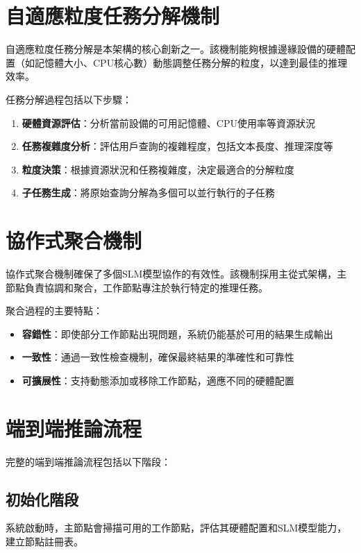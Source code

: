 \section{自適應粒度任務分解機制}

自適應粒度任務分解是本架構的核心創新之一。該機制能夠根據邊緣設備的硬體配置（如記憶體大小、CPU核心數）動態調整任務分解的粒度，以達到最佳的推理效率。

任務分解過程包括以下步驟：

\begin{enumerate}
    \item \textbf{硬體資源評估}：分析當前設備的可用記憶體、CPU使用率等資源狀況
    \item \textbf{任務複雜度分析}：評估用戶查詢的複雜程度，包括文本長度、推理深度等
    \item \textbf{粒度決策}：根據資源狀況和任務複雜度，決定最適合的分解粒度
    \item \textbf{子任務生成}：將原始查詢分解為多個可以並行執行的子任務
\end{enumerate}

\section{協作式聚合機制}

協作式聚合機制確保了多個SLM模型協作的有效性。該機制採用主從式架構，主節點負責協調和聚合，工作節點專注於執行特定的推理任務。

聚合過程的主要特點：

\begin{itemize}
    \item \textbf{容錯性}：即使部分工作節點出現問題，系統仍能基於可用的結果生成輸出
    \item \textbf{一致性}：通過一致性檢查機制，確保最終結果的準確性和可靠性
    \item \textbf{可擴展性}：支持動態添加或移除工作節點，適應不同的硬體配置
\end{itemize}

\section{端到端推論流程}

完整的端到端推論流程包括以下階段：

\subsection{初始化階段}
系統啟動時，主節點會掃描可用的工作節點，評估其硬體配置和SLM模型能力，建立節點註冊表。


